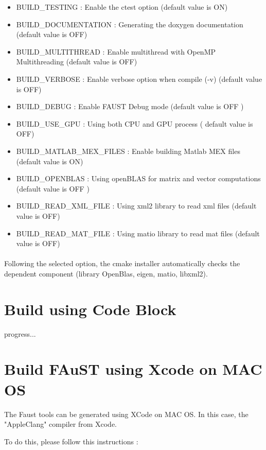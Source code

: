 \begin{itemize}
\item BUILD\_TESTING : Enable the ctest option (default value is ON)
\item BUILD\_DOCUMENTATION : Generating the doxygen documentation (default value is OFF)  
\item BUILD\_MULTITHREAD : Enable multithread with OpenMP Multithreading (default value is OFF)
\item BUILD\_VERBOSE : Enable verbose option when compile (-v) (default value is OFF)
\item BUILD\_DEBUG : Enable FAUST Debug mode (default value is OFF )
\item BUILD\_USE\_GPU : Using both CPU and GPU process ( default value is OFF)
\item BUILD\_MATLAB\_MEX\_FILES : Enable building Matlab MEX files (default value is ON)
\item BUILD\_OPENBLAS : Using openBLAS for matrix and vector computations (default value is OFF )
\item BUILD\_READ\_XML\_FILE : Using xml2 library to read xml files (default value is OFF)
\item BUILD\_READ\_MAT\_FILE : Using matio library to read mat files (default value is OFF)
\end{itemize}

\paragraph{}Following the selected option, the cmake installer automatically checks the dependent component (library OpenBlas, eigen, matio, libxml2).  

\section{Build using Code Block}\label{sec:UnixInstallCodeBlock}
progress...

\section{Build FAuST using Xcode on MAC OS}\label{sec:MacInstallXcode}

The Faust tools can be generated using XCode on MAC OS. In this case, the "AppleClang" compiler from Xcode.

To do this, please follow this instructions :

